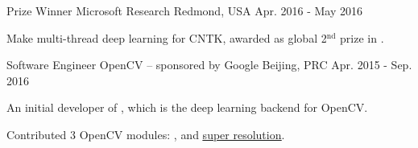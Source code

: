 \begin{cventries}
\cventry
{Prize Winner} %
{Microsoft Research} %
{Redmond, USA} %
{Apr. 2016 - May 2016} %
{ %
\begin{cvitems}
\item {Make multi-thread deep learning for CNTK, awarded as global 2$^\text{nd}$ prize in \href{https://www.microsoft.com/en-us/research/academic-program/microsoft-open-source-challenge/}{}.} %
\end{cvitems}
}

\cventry
{Software Engineer} %
{OpenCV -- sponsored by Google} %
{Beijing, PRC} %
{Apr. 2015 - Sep. 2016} %
{ %
\begin{cvitems}
\item {An initial developer of \href{https://github.com/tiny-dnn/tiny-dnn}{}, which is the deep learning backend for OpenCV}.
\item {Contributed 3 OpenCV modules: \href{https://www.youtube.com/watch?v=Mc20rTYdXTE}{}, \href{https://summerofcode.withgoogle.com/archive/2016/projects/4623962327744512}{} and \href{https://summerofcode.withgoogle.com/archive/2019/projects/6247164785721344}{\color{awesome-skyblue}\underline{super resolution}}.}
\end{cvitems}
}


\end{cventries}

